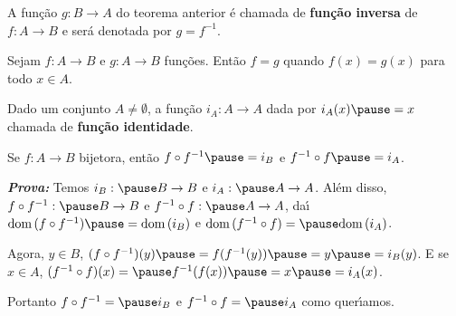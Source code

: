 \documentclass{beamer}
\begin{document}
    \begin{frame}
        \begin{definicao}
            A fun\c{c}\~ao $g : B \to A$ \pause do teorema anterior \pause \'e chamada de \textbf{fun\c{c}\~ao inversa} \pause de $f : A \to B$ \pause e ser\'a denotada por $g = f^{-1}$.\pause
        \end{definicao}

        \vspace{.3cm}

        \begin{definicao}
            Sejam $f : A \to B$ \pause e $g : A \to B$ fun\c{c}\~oes. \pause Ent\~ao $f = g$ \pause quando $f(x) = g(x)$ \pause para todo $x \in A$.\pause
        \end{definicao}

        \vspace{.3cm}
        
        \begin{definicao}
            Dado um conjunto $A \ne \emptyset$, \pause a fun{\c c}{\~a}o $i_{A}: A \to A$ \pause dada por $i_{A}(x) \pause = x$  chamada de \pause \textbf{fun{\c c}{\~a}o identidade}.\pause
        \end{definicao}
    \end{frame}

    \begin{frame}
        \begin{proposicao}
            Se $f : A \to B$  bijetora, \pause ent{\~a}o $f\circ f^{-1} \pause = i_{B}$ \pause e $f^{-1}\circ f \pause = i_{A}$.\pause
        \end{proposicao}
        \textbf{\textit{Prova: }}\pause
        Temos $i_{B} : \pause B \to B$ \pause e $i_{A} : \pause A \to A$. \pause Al{\'e}m disso, \pause $f\circ f^{-1} : \pause B \to B$ \pause e $f^{-1}\circ f : \pause A \to A$, \pause da{\'\i} $\dom(f\circ f^{-1}) \pause = \dom(i_{B})$ \pause e $\dom(f^{-1}\circ f) = \pause \dom(i_{A})$. \pause 

        \vspace{.5cm}

        Agora, $y \in B$, \pause $(f\circ f^{-1})(y) \pause = f(f^{-1}(y)) \pause = y \pause = i_{B}(y)$. \pause E se $x \in A$, \pause $(f^{-1}\circ f)(x) = \pause f^{-1}(f(x)) \pause = x \pause = i_{A}(x)$. \pause 

        \vspace{.5cm}

        Portanto $f\circ f^{-1} = \pause i_{B}$ \pause e $f^{-1}\circ f = \pause i_{A}$ como quer{\'\i}amos.\pause \hspace{.5cm} \qedsymbol
    \end{frame}
\end{document}
